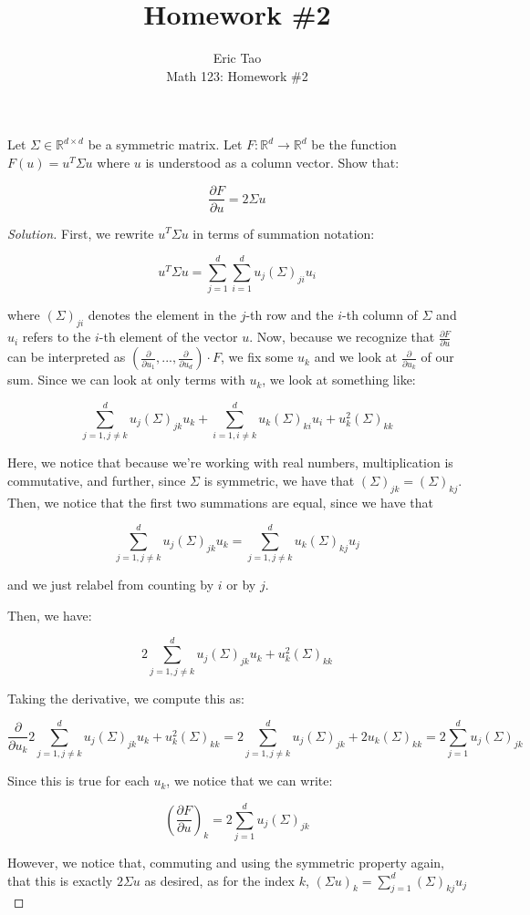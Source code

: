 \documentclass[10pt]{article}
\newenvironment{problem}[2][]{\begin{trivlist}
\item[\hskip \labelsep {\bfseries #1}\hskip \labelsep {\bfseries #2.}]}{\end{trivlist}}
\begin{document}
 
\title{Homework \#2}
\author{Eric Tao\\
Math 123: Homework \#2}
\maketitle

\begin{problem}{Question 1}
Let $\Sigma \in \mathbb{R}^{d \times d}$ be a symmetric matrix. Let $F: \mathbb{R}^d \to \mathbb{R}^d$ be the function $F(u) = u^T \Sigma u$ where $u$ is understood as a column vector. Show that:

$$\frac{\partial F}{\partial u} = 2\Sigma u$$

\end{problem}
\begin{proof}[Solution]
First, we rewrite $u^T\Sigma u$ in terms of summation notation:

$$ u^T \Sigma u = \sum_{j=1}^d \sum_{i=1}^d u_j (\Sigma)_{ji} u_i $$

where $(\Sigma)_{ji}$ denotes the element in the $j$-th row and the $i$-th column of $\Sigma$ and $u_i$ refers to the $i$-th element of the vector $u$. Now, because we recognize that $\frac{\partial F}{\partial u}$ can be interpreted as $(\frac{\partial}{\partial u_1},..., \frac{\partial}{\partial u_d}) \cdot F$, we fix some $u_k$ and we look at $\frac{\partial}{\partial u_k}$ of our sum. Since we can look at only terms with $u_k$, we look at something like:

$$ \sum_{j=1, j \not = k}^d  u_j (\Sigma)_{jk} u_k+  \sum_{i=1, i \not = k}^d u_k (\Sigma)_{ki} u_i + u_k^2 (\Sigma)_{kk}$$

Here, we notice that because we're working with real numbers, multiplication is commutative, and further, since $\Sigma$ is symmetric, we have that $(\Sigma)_{jk} = (\Sigma)_{kj}$. Then, we notice that the first two summations are equal, since we have that

$$  \sum_{j=1, j \not = k}^d  u_j (\Sigma)_{jk} u_k =  \sum_{j=1, j \not = k}^d  u_k (\Sigma)_{kj} u_j$$

and we just relabel from counting by $i$ or by $j$.

Then, we have:

$$2 \sum_{j=1, j \not = k}^d  u_j (\Sigma)_{jk} u_k+ u_k^2 (\Sigma)_{kk}$$

Taking the derivative, we compute this as:

$$ \frac{\partial}{\partial u_k} 2 \sum_{j=1, j \not = k}^d  u_j (\Sigma)_{jk} u_k+ u_k^2 (\Sigma)_{kk} = 2 \sum_{j=1, j \not = k}^d  u_j (\Sigma)_{jk} + 2 u_k (\Sigma)_{kk} = 2 \sum_{j=1}^d  u_j (\Sigma)_{jk} $$

Since this is true for each $u_k$, we notice that we can write:

$$ (\frac{\partial F}{\partial u})_k = 2 \sum_{j=1}^d  u_j (\Sigma)_{jk} $$

However, we notice that, commuting and using the symmetric property again, that this is exactly $2 \Sigma u$ as desired, as for the index $k$, $(\Sigma u )_k = \sum_{j=1}^d (\Sigma)_{kj} u_j$
\end{proof}
\end{document}
